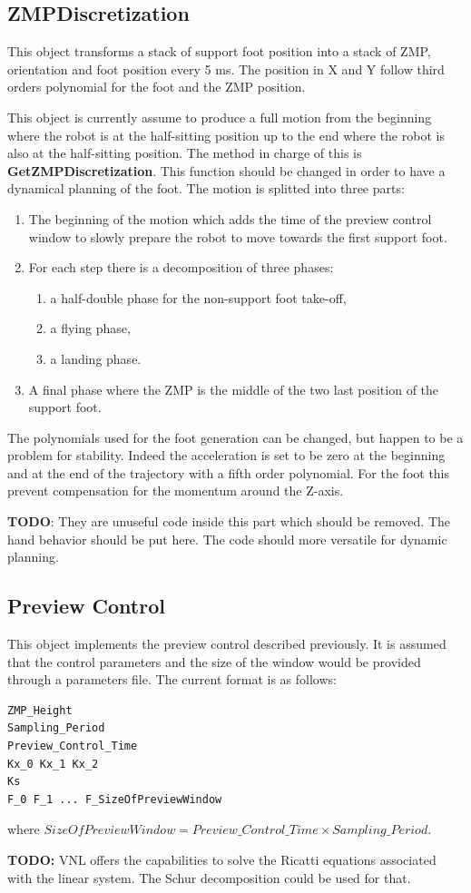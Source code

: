\subsection{ZMPDiscretization}
This object transforms a stack of support foot position into a stack of ZMP, orientation and foot position every 5 ms.
The position in X and Y follow third orders polynomial for the foot and the ZMP position. 
\par
This object is currently assume to produce a full motion from the beginning where the robot is at the half-sitting position 
up to the end where the robot is also at the half-sitting position.
The method in charge of this is {\bf GetZMPDiscretization}. This function should be
changed in order to have a dynamical planning of the foot.
The motion is splitted into three parts:
\begin{enumerate}
\item The beginning of the motion which adds the time of the preview control window to slowly prepare
the robot to move towards the first support foot.
\item For each step there is a decomposition of three phases: 
\begin{enumerate}
\item a half-double phase for the non-support foot take-off, 
\item a flying phase,
\item a landing phase. 
\end{enumerate}
\item A final phase where the ZMP is the middle of the two last position of the support foot.
\end{enumerate}
\par
The polynomials used for the foot generation can be changed, but happen to be a problem for stability. 
Indeed the acceleration is set to be zero at the beginning 
and at the end of the trajectory with a fifth order polynomial. For the foot this prevent compensation for the momentum around 
the Z-axis.

{\bf TODO}: They are unuseful code inside this part which should be removed.
The hand behavior should be put here. The code should more versatile for dynamic planning.

\subsection{Preview Control}
This object implements the preview control described previously. 
It is assumed that the control parameters and the size of the window would be provided through
a parameters file. The current format is as follows:
\begin{verbatim}
ZMP_Height
Sampling_Period
Preview_Control_Time
Kx_0 Kx_1 Kx_2
Ks
F_0 F_1 ... F_SizeOfPreviewWindow
\end{verbatim}
where $SizeOfPreviewWindow = Preview\_Control\_Time \times Sampling\_Period$.
\par
{\bf TODO:} VNL offers the capabilities to solve the Ricatti equations 
associated with the linear system. The Schur decomposition could be used for that.


